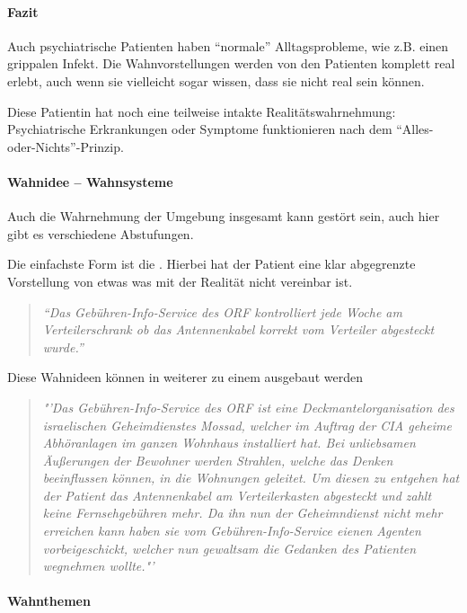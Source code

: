 \paragraph{Fazit}

Auch psychiatrische Patienten haben "`normale"'
Alltagsprobleme, wie z.B. einen grippalen Infekt. Die
Wahnvorstellungen werden von den Patienten komplett real
erlebt, auch wenn sie vielleicht sogar wissen, dass sie nicht
real sein können. 

Diese Patientin hat noch eine teilweise
intakte Realitätswahrnehmung: Psychiatrische Erkrankungen
oder Symptome funktionieren  nach dem
"`Alles-oder-Nichts"'-Prinzip.


\paragraph{Wahnidee -- Wahnsysteme}

Auch die Wahrnehmung der Umgebung insgesamt kann gestört
sein, auch hier gibt es verschiedene Abstufungen. 

Die einfachste Form ist die . Hierbei hat der
Patient eine klar abgegrenzte Vorstellung von etwas was mit
der Realität nicht vereinbar ist. 

\begin{quotation}
\emph{"`Das
Gebühren-Info-Service des ORF kontrolliert jede Woche am
Verteilerschrank ob das Antennenkabel korrekt vom
Verteiler abgesteckt wurde."'}
\end{quotation}

Diese Wahnideen können in weiterer zu einem 
ausgebaut werden 



\begin{quotation}
\emph{"'Das Gebühren-Info-Service
des ORF ist eine Deckmantelorganisation des israelischen
Geheimdienstes Mossad, welcher im Auftrag der CIA geheime
Abhöranlagen im ganzen Wohnhaus installiert hat. Bei
unliebsamen Äußerungen der Bewohner werden Strahlen, welche
das Denken beeinflussen können, in die Wohnungen geleitet.
Um diesen zu entgehen hat der Patient das Antennenkabel am
Verteilerkasten abgesteckt und zahlt keine Fernsehgebühren
mehr. Da ihn nun der Geheimndienst nicht mehr erreichen
kann haben sie vom Gebühren-Info-Service eienen Agenten
vorbeigeschickt, welcher nun gewaltsam die Gedanken des
Patienten wegnehmen wollte."'}
\end{quotation}

\paragraph{Wahnthemen} 


